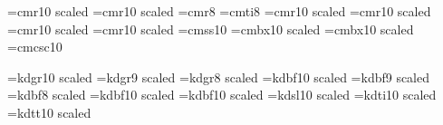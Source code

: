 
\font\brm=cmr10 scaled 
\font\halfrm=cmr10 scaled \magstephalf
\font\eightrm=cmr8
\font\eightit=cmti8
\font\bbrm=cmr10 scaled 
\font\bbbrm=cmr10 scaled 
\font\bbbbrm=cmr10 scaled 
\font\bbbbbrm=cmr10 scaled 
\font\sf=cmss10
\font\lchapfont=cmbx10 scaled       %
\font\lsecfont=cmbx10 scaled        %
\font\sc=cmcsc10




\font\tengr=kdgr10 scaled           %
\font\ninegr=kdgr9 scaled           %
\font\eightgr=kdgr8 scaled          %
\font\tengb=kdbf10 scaled           %
\font\ninegb=kdbf9 scaled           %
\font\eightgb=kdbf8 scaled          %
\font\chapfont=kdbf10 scaled        %
\font\secfont=kdbf10 scaled         %
\font\tengs=kdsl10 scaled           %
\font\tengi=kdti10 scaled           %
\font\tengt=kdtt10 scaled           %


\def\digamma{\char'020}    %
\def\stigma{\char'143}     %
\def\Koppa{\char'022}      %
\def\koppa{\char'023}      %
\def\varkoppa{\char'021}   %
\def\sampi{\char'024}      %
\def\numbertick{\char'003} %
\def\pretick{\char'004}    %




